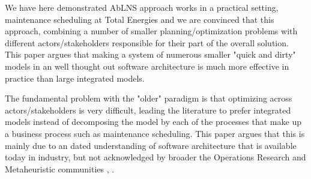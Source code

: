 We have here demonstrated AbLNS approach works in a practical setting,
maintenance scheduling at  Total Energies and we are convinced that this
approach, combining a number of smaller planning/optimization problems with
different actors/stakeholders responsible for their part of the overall
solution. This paper argues that making a system of numerous smaller  "quick
and dirty" models in an well thought out software architecture is much more
effective in practice than large integrated models.

The fundamental problem with the "older" paradigm is that optimizing across
actors/stakeholders is very difficult, leading the literature to prefer
integrated models instead of decomposing the model by each of the
processes that make up a business process such as maintenance scheduling.
This paper argues that this is mainly due to an dated understanding of
software architecture that is available today in industry, but not
acknowledged by broader the Operations Research and Metaheuristic
communities \citep{talbiMetaheuristicsDesignImplementation2009},
\citep{gendreauHandbookMetaheuristics2019}.

